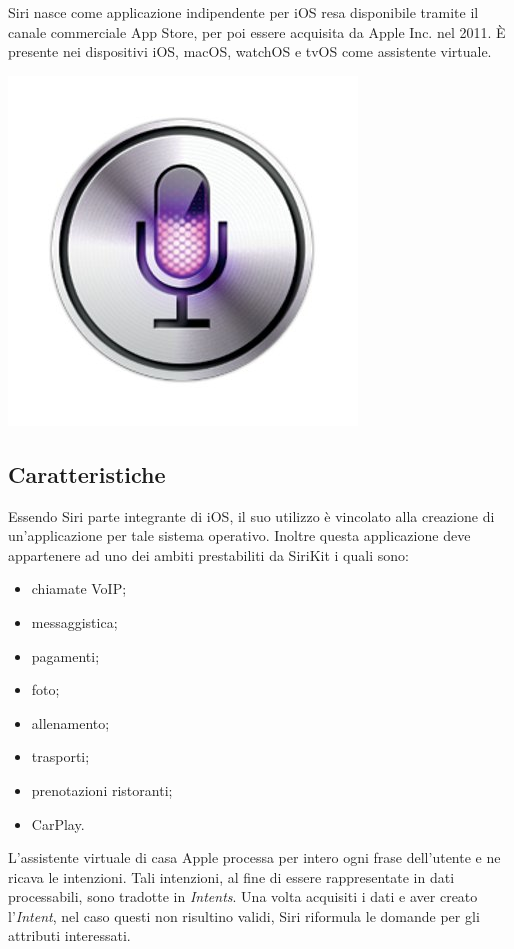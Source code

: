 \documentclass[a4paper,titlepage]{article}
\begin{document}
	\begin{minipage}{0.7\textwidth}\raggedright
		Siri nasce come applicazione indipendente per iOS resa disponibile tramite il canale commerciale App Store, per poi essere acquisita da Apple Inc. nel 2011. È presente nei dispositivi iOS, macOS, watchOS e tvOS come assistente virtuale.
	\end{minipage}
	\hfill
	\noindent\begin{minipage}{0.1\textwidth}
		\includegraphics[scale=0.3]{images/siri.jpg}
	\end{minipage}
	\subsection{Caratteristiche}
		Essendo Siri parte integrante di iOS, il suo utilizzo è vincolato alla creazione di un'applicazione per tale sistema operativo. Inoltre questa applicazione deve appartenere ad uno dei ambiti prestabiliti da SiriKit i quali sono:
			\begin{itemize}
				\item chiamate VoIP;
				\item messaggistica;
				\item pagamenti;
				\item foto;
				\item allenamento;
				\item trasporti;
				\item prenotazioni ristoranti;
				\item CarPlay.
			\end{itemize}
		L'assistente virtuale di casa Apple processa per intero ogni frase dell'utente e ne ricava le intenzioni. Tali intenzioni, al fine di essere rappresentate in dati processabili, sono tradotte in \textit{Intents}. Una volta acquisiti i dati e aver creato l'\textit{Intent}, nel caso questi non risultino validi, Siri riformula le domande per gli attributi interessati.
\newpage
\end{document}
